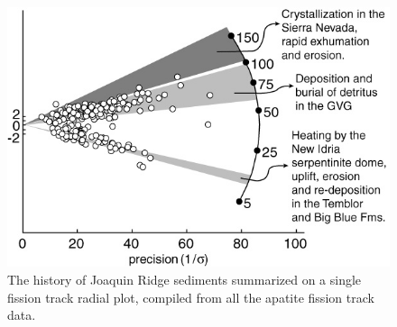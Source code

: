 \documentclass[11pt,twoside]{article}
\begin{document}
\begin{figure}[here]
   \includegraphics[width=400pt]{compiledAFT.jpg}
   \caption{
The history of Joaquin Ridge  sediments summarized on a single fission
track radial plot, compiled from all the apatite fission track data.}
   \label{fig:JR6}
\end{figure}
\end{document}

